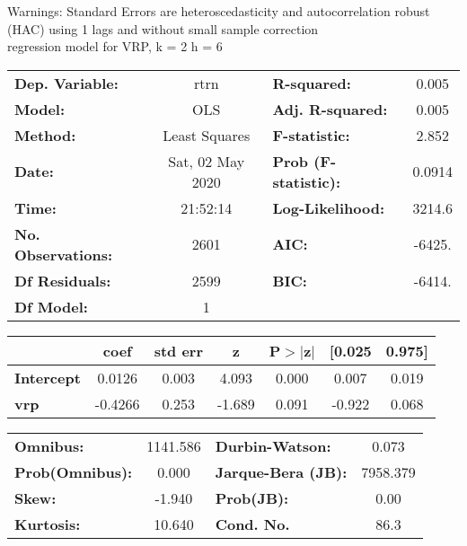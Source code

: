Warnings: \newline
 [1] Standard Errors are heteroscedasticity and autocorrelation robust (HAC) using 1 lags and without small sample correction\\ 

regression model for VRP, k = 2 h = 6\begin{center}
\begin{tabular}{lclc}
\toprule
\textbf{Dep. Variable:}    &       rtrn       & \textbf{  R-squared:         } &     0.005   \\
\textbf{Model:}            &       OLS        & \textbf{  Adj. R-squared:    } &     0.005   \\
\textbf{Method:}           &  Least Squares   & \textbf{  F-statistic:       } &     2.852   \\
\textbf{Date:}             & Sat, 02 May 2020 & \textbf{  Prob (F-statistic):} &   0.0914    \\
\textbf{Time:}             &     21:52:14     & \textbf{  Log-Likelihood:    } &    3214.6   \\
\textbf{No. Observations:} &        2601      & \textbf{  AIC:               } &    -6425.   \\
\textbf{Df Residuals:}     &        2599      & \textbf{  BIC:               } &    -6414.   \\
\textbf{Df Model:}         &           1      & \textbf{                     } &             \\
\bottomrule
\end{tabular}
\begin{tabular}{lcccccc}
                   & \textbf{coef} & \textbf{std err} & \textbf{z} & \textbf{P$> |$z$|$} & \textbf{[0.025} & \textbf{0.975]}  \\
\midrule
\textbf{Intercept} &       0.0126  &        0.003     &     4.093  &         0.000        &        0.007    &        0.019     \\
\textbf{vrp}       &      -0.4266  &        0.253     &    -1.689  &         0.091        &       -0.922    &        0.068     \\
\bottomrule
\end{tabular}
\begin{tabular}{lclc}
\textbf{Omnibus:}       & 1141.586 & \textbf{  Durbin-Watson:     } &    0.073  \\
\textbf{Prob(Omnibus):} &   0.000  & \textbf{  Jarque-Bera (JB):  } & 7958.379  \\
\textbf{Skew:}          &  -1.940  & \textbf{  Prob(JB):          } &     0.00  \\
\textbf{Kurtosis:}      &  10.640  & \textbf{  Cond. No.          } &     86.3  \\
\bottomrule
\end{tabular}
\end{center}

